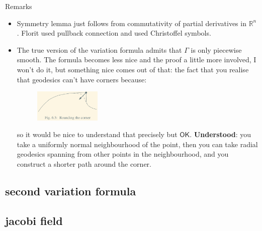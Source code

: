 \begin{thing8}{Remarks}\leavevmode
\begin{itemize}
\item Symmetry lemma just follows from commutativity of partial derivatives in \(\mathbb{R}^{n}\). Florit used pullback connection and \cite{ler} used Christoffel symbols.
\item The true version of the variation formula admits that \(\Gamma\) is only piecewise smooth. The formula becomes less nice and the proof a little more involved, I won't do it, but something nice comes out of that: the fact that you realise that geodesics can't have corners because:
	\begin{figure}[H]
		\centering
		\includegraphics[width=0.3\textwidth]{fig3}
	\end{figure}
	so it would be nice to understand that precisely but \(\mathsf{OK}\). \textbf{Understood}: you take a uniformly normal neighbourhood of the point, then you can take radial geodesics spanning from other points in the neighbourhood, and you construct a shorter path around the corner.
\end{itemize}
\end{thing8}

\subsection{second variation formula}



\subsection{jacobi field}

